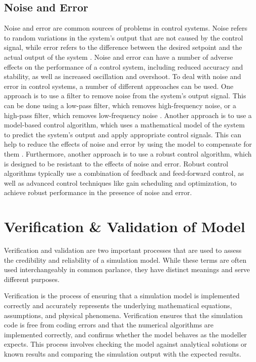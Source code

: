 \subsection{Noise and Error}
Noise and error are common sources of problems in control systems. Noise refers to random variations in the system's output that are not caused by the control signal, while error refers to the difference between the desired setpoint and the actual output of the system \cite{Rames_2012}. Noise and error can have a number of adverse effects on the performance of a control system, including reduced accuracy and stability, as well as increased oscillation and overshoot. To deal with noise and error in control systems, a number of different approaches can be used. One approach is to use a filter to remove noise from the system's output signal. This can be done using a low-pass filter, which removes high-frequency noise, or a high-pass filter, which removes low-frequency noise \cite{Franklin2014}. Another approach is to use a model-based control algorithm, which uses a mathematical model of the system to predict the system's output and apply appropriate control signals. This can help to reduce the effects of noise and error by using the model to compensate for them . Furthermore, another approach is to use a robust control algorithm, which is designed to be resistant to the effects of noise and error. Robust control algorithms typically use a combination of feedback and feed-forward control, as well as advanced control techniques like gain scheduling and optimization, to achieve robust performance in the presence of noise and error.

\section{Verification \& Validation of Model}
Verification and validation are two important processes that are used to assess the credibility and reliability of a simulation model. While these terms are often used interchangeably in common parlance, they have distinct meanings and serve different purposes.

Verification is the process of ensuring that a simulation model is implemented correctly and accurately represents the underlying mathematical equations, assumptions, and physical phenomena. Verification ensures that the simulation code is free from coding errors and that the numerical algorithms are implemented correctly, and confirms whether the model behaves as the modeller expects. This process involves checking the model against analytical solutions or known results and comparing the simulation output with the expected results.

